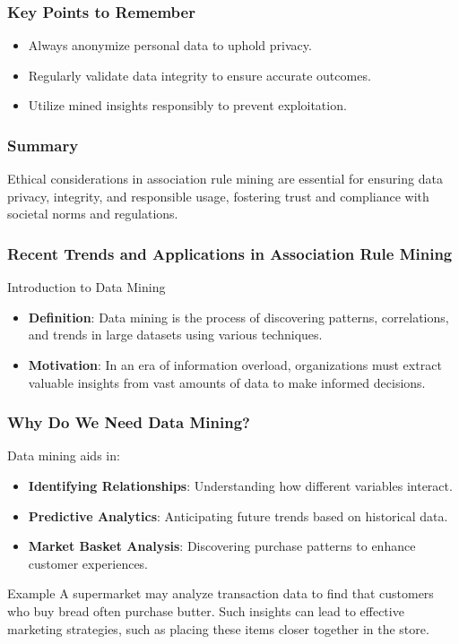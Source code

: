 \documentclass[aspectratio=169]{beamer}
\begin{document}
\begin{frame}[fragile]
    \frametitle{Key Points to Remember}
    \begin{itemize}
        \item Always anonymize personal data to uphold privacy.
        \item Regularly validate data integrity to ensure accurate outcomes.
        \item Utilize mined insights responsibly to prevent exploitation.
    \end{itemize}
\end{frame}

\begin{frame}[fragile]
    \frametitle{Summary}
    Ethical considerations in association rule mining are essential for ensuring data privacy, integrity, and responsible usage, fostering trust and compliance with societal norms and regulations.
\end{frame}

\begin{frame}[fragile]
  \frametitle{Recent Trends and Applications in Association Rule Mining}
  
  \begin{block}{Introduction to Data Mining}
    \begin{itemize}
      \item \textbf{Definition}: Data mining is the process of discovering patterns, correlations, and trends in large datasets using various techniques.
      \item \textbf{Motivation}: In an era of information overload, organizations must extract valuable insights from vast amounts of data to make informed decisions.
    \end{itemize}
  \end{block}
  
\end{frame}

\begin{frame}[fragile]
  \frametitle{Why Do We Need Data Mining?}

  Data mining aids in:

  \begin{itemize}
    \item \textbf{Identifying Relationships}: Understanding how different variables interact.
    \item \textbf{Predictive Analytics}: Anticipating future trends based on historical data.
    \item \textbf{Market Basket Analysis}: Discovering purchase patterns to enhance customer experiences.
  \end{itemize}

  \begin{block}{Example}
    A supermarket may analyze transaction data to find that customers who buy bread often purchase butter. Such insights can lead to effective marketing strategies, such as placing these items closer together in the store.
  \end{block}
  
\end{frame}
\end{document}
